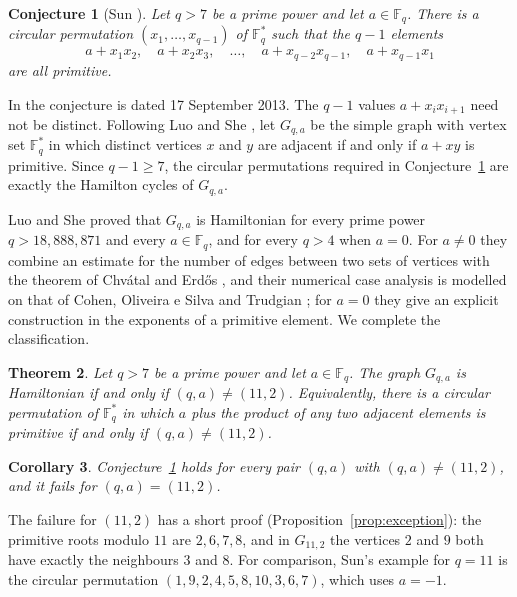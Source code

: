 \documentclass{amsart}
\newtheorem{theorem}{Theorem}[section]
\newtheorem{corollary}[theorem]{Corollary}
\newtheorem{conjecture}[theorem]{Conjecture}
\theoremstyle{remark}
\numberwithin{equation}{section}
\numberwithin{table}{section}
\newcommand{\F}{\mathbb{F}}
\begin{document}
\begin{conjecture}[Sun {\cite[Conjecture~3.8]{Sun}}]\label{conj:sun}
Let $q>7$ be a prime power and let $a\in\F_q$. There is a circular permutation $(x_1,\dots,x_{q-1})$ of $\F_q^{*}$ such that the $q-1$ elements
\[
a+x_1x_2,\quad a+x_2x_3,\quad \dots,\quad a+x_{q-2}x_{q-1},\quad a+x_{q-1}x_1
\]
are all primitive.
\end{conjecture}

In \cite{Sun} the conjecture is dated 17 September 2013. The $q-1$ values $a+x_ix_{i+1}$ need not be distinct. Following Luo and She \cite{LS}, let $G_{q,a}$ be the simple graph with vertex set $\F_q^{*}$ in which distinct vertices $x$ and $y$ are adjacent if and only if $a+xy$ is primitive. Since $q-1\ge 7$, the circular permutations required in Conjecture~\ref{conj:sun} are exactly the Hamilton cycles of $G_{q,a}$.

Luo and She \cite[Theorem~1.2]{LS} proved that $G_{q,a}$ is Hamiltonian for every prime power $q>18{,}888{,}871$ and every $a\in\F_q$, and for every $q>4$ when $a=0$. For $a\neq0$ they combine an estimate for the number of edges between two sets of vertices with the theorem of Chv\'atal and Erd\H{o}s \cite{CE}, and their numerical case analysis is modelled on that of Cohen, Oliveira e Silva and Trudgian \cite{COT}; for $a=0$ they give an explicit construction in the exponents of a primitive element. We complete the classification.

\begin{theorem}\label{thm:main}
Let $q>7$ be a prime power and let $a\in\F_q$. The graph $G_{q,a}$ is Hamiltonian if and only if $(q,a)\neq(11,2)$. Equivalently, there is a circular permutation of $\F_q^{*}$ in which $a$ plus the product of any two adjacent elements is primitive if and only if $(q,a)\neq(11,2)$.
\end{theorem}

\begin{corollary}\label{cor:sun}
Conjecture~\ref{conj:sun} holds for every pair $(q,a)$ with $(q,a)\neq(11,2)$, and it fails for $(q,a)=(11,2)$.
\end{corollary}

The failure for $(11,2)$ has a short proof (Proposition~\ref{prop:exception}): the primitive roots modulo $11$ are $2,6,7,8$, and in $G_{11,2}$ the vertices $2$ and $9$ both have exactly the neighbours $3$ and $8$. For comparison, Sun's example for $q=11$ \cite[Remark~3.8]{Sun} is the circular permutation $(1,9,2,4,5,8,10,3,6,7)$, which uses $a=-1$.
\end{document}
